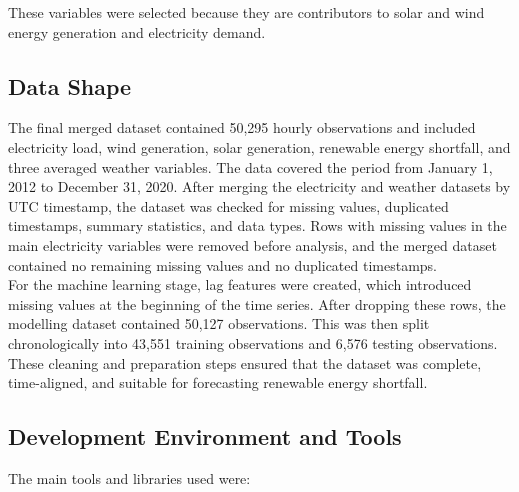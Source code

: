 \documentclass[conference]{IEEEtran}
\begin{document}
These variables were selected because they are contributors to solar and wind energy generation and electricity demand.

\subsection{Data Shape}
The final merged dataset contained 50,295 hourly observations and included electricity load, wind generation, solar generation, renewable energy shortfall, and three averaged weather variables. The data covered the period from January 1, 2012 to December 31, 2020. After merging the electricity and weather datasets by UTC timestamp, the dataset was checked for missing values, duplicated timestamps, summary statistics, and data types. Rows with missing values in the main electricity variables were removed before analysis, and the merged dataset contained no remaining missing values and no duplicated timestamps. 
\\For the machine learning stage, lag features were created, which introduced missing values at the beginning of the time series. After dropping these rows, the modelling dataset contained 50,127 observations. This was then split chronologically into 43,551 training observations and 6,576 testing observations. These cleaning and preparation steps ensured that the dataset was complete, time-aligned, and suitable for forecasting renewable energy shortfall.

\subsection{Development Environment and Tools}
The main tools and libraries used were:
\end{document}
